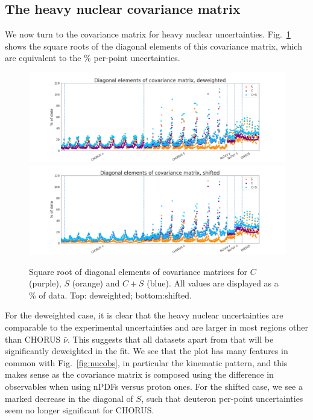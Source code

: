 \subsection{The heavy nuclear covariance matrix}
We now turn to the covariance matrix for heavy nuclear uncertainties. Fig.~\ref{fig:nuccov1} shows the square roots of the diagonal elements of this covariance matrix, which are equivalent to the \% per-point uncertainties. 
\begin{figure}[h]
  \begin{center}
    \includegraphics[width=\linewidth, trim={4cm 0 4cm 0}]{nuclear/plots/diag_covmat_deweighted.png}
        \includegraphics[width=\linewidth, trim={4cm 0 4cm 0}]{nuclear/plots/diag_covmat_shifted.png}
    \caption{Square root of diagonal elements of covariance matrices for $C$ (purple), $S$ (orange) and $C+S$ (blue). All values are displayed as a \% of data. Top: deweighted; bottom:shifted.
    \label{fig:nuccov1} }
    \end{center}
\end{figure}   
For the deweighted case, it is clear that the heavy nuclear uncertainties are comparable to the experimental uncertainties and are larger in most regions other than CHORUS $\bar{\nu}$. This suggests that all datasets apart from that will be significantly deweighted in the fit. We see that the plot has many features in common with Fig.~\ref{fig:nucobs}, in particular the kinematic pattern, and this makes sense as the covariance matrix is composed using the difference in observables when using nPDFs versus proton ones. For the shifted case, we see a marked decrease in the diagonal of $S$, such that deuteron per-point uncertainties seem no longer significant for CHORUS.
 
